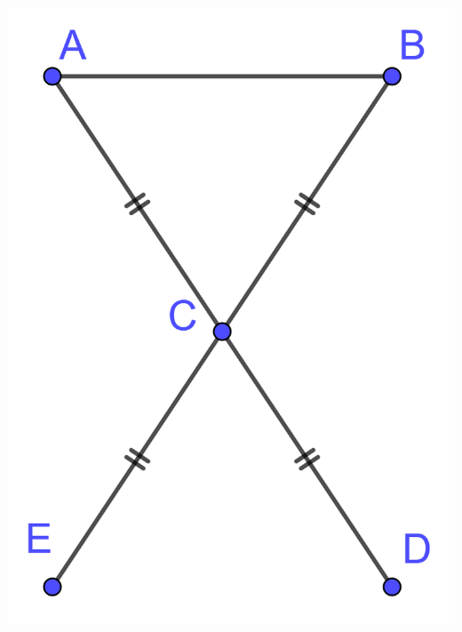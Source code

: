 \begin{multicols}{2}
\begin{center}
	\includegraphics[scale=0.13]{img/tabouret}
\end{center}
	
	
\end{multicols}